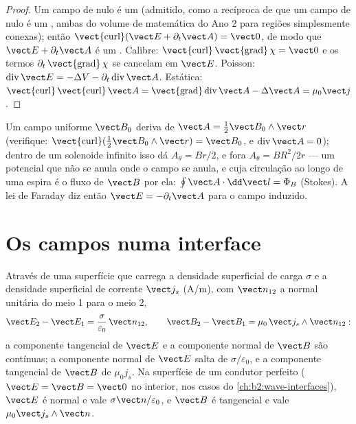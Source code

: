 \begin{proof}
Um campo de  nulo é um  (admitido, como a recíproca
de que um campo de  nulo é um , ambas do volume de
matemática do Ano 2 para regiões simplesmente conexas); então $\operatorname{\vect{curl}}
(\vect E + \partial_t\vect A) = \vect 0$, de modo que $\vect E + \partial_t\vect A$ é um .
Calibre: $\operatorname{\vect{curl}}\operatorname{\vect{grad}}\chi = \vect 0$ e os
termos $\partial_t\operatorname{\vect{grad}}\chi$ se cancelam em $\vect E$. Poisson: $\operatorname{div}
\vect E = -\Delta V - \partial_t\operatorname{div}\vect A$. Estática: $\operatorname{\vect{curl}}
\operatorname{\vect{curl}}\vect A = \operatorname{\vect{grad}}\operatorname{div}\vect A - \Delta\vect A
= \mu_0\vect j$.
\end{proof}

\begin{example}\label{ex:b2:maxwell-equations:vectorpot}
Um campo uniforme $\vect B_0$ deriva de $\vect A = \tfrac12\vect B_0\wedge\vect r$
(verifique: $\operatorname{\vect{curl}}(\tfrac12\vect B_0\wedge\vect r) = \vect B_0$, e
$\operatorname{div}\vect A = 0$); dentro de um solenoide infinito isso dá $A_\theta =
Br/2$, e fora $A_\theta = BR^2/2r$ --- um potencial que não se anula
onde o campo se anula, e cuja circulação ao longo de uma espira é o fluxo
de $\vect B$ por ela: $\oint\vect A\cdot\dd\vect l = \Phi_B$ (Stokes). A lei de Faraday
diz então $\vect E = -\partial_t\vect A$ para o campo induzido.
\end{example}

\section{Os campos numa interface}

\begin{proposition}\label{prop:b2:maxwell-equations:boundary}
Através de uma superfície que carrega a densidade superficial de carga $\sigma$ e a
densidade superficial de corrente $\vect j_s$ (\unit{A/m}), com $\vect n_{12}$ a
normal unitária do meio 1 para o meio 2,
\[
\vect E_2 - \vect E_1 = \frac\sigma{\varepsilon_0}\,\vect n_{12} , \qquad
\vect B_2 - \vect B_1 = \mu_0\,\vect j_s\wedge\vect n_{12} :
\]
a componente tangencial de $\vect E$ e a componente normal de $\vect B$
são contínuas; a componente normal de $\vect E$ salta de $\sigma/\varepsilon_0$,
e a componente tangencial de $\vect B$ de $\mu_0j_s$. Na superfície de um
condutor perfeito ($\vect E = \vect B = \vect 0$ no interior, nos casos do
\cref{ch:b2:wave-interfaces}), $\vect E$ é normal e vale $\sigma\vect n/
\varepsilon_0$, e $\vect B$ é tangencial e vale $\mu_0\vect j_s\wedge\vect n$.
\end{proposition}

